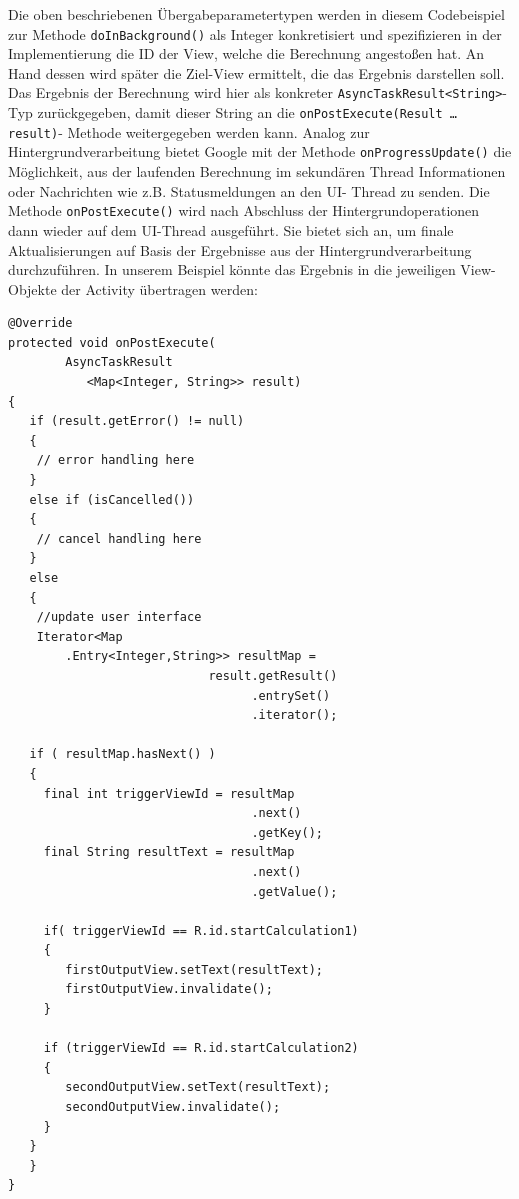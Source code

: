 \documentclass[12pt,oneside,a4paper,bibtotoc,liststotoc]{scrreprt}
\begin{document}
Die oben beschriebenen Übergabeparametertypen werden in diesem Codebeispiel zur Methode \texttt{doInBackground()} als Integer konkretisiert und spezifizieren in der Implementierung die ID der View, welche die Berechnung angestoßen hat. An Hand dessen wird später die Ziel-View ermittelt, die das Ergebnis darstellen soll. Das Ergebnis der Berechnung wird hier als konkreter \texttt{AsyncTaskResult<String>}- Typ zurückgegeben, damit dieser String an die \texttt{onPostExecute(Result … result)}- Methode weitergegeben werden kann. Analog zur Hintergrundverarbeitung bietet Google mit der Methode \texttt{onProgressUpdate()} die Möglichkeit, aus der laufenden Berechnung im sekundären Thread Informationen oder Nachrichten wie z.B. Statusmeldungen an den UI- Thread zu senden. Die Methode \texttt{onPostExecute()} wird nach Abschluss der Hintergrundoperationen dann wieder auf dem UI-Thread ausgeführt. Sie bietet sich an, um finale Aktualisierungen auf Basis der Ergebnisse aus der Hintergrundverarbeitung durchzuführen. In unserem Beispiel könnte das Ergebnis in die jeweiligen View- Objekte der Activity übertragen werden:\newline
\begin{lstlisting}
@Override
protected void onPostExecute(
        AsyncTaskResult
           <Map<Integer, String>> result)
{
   if (result.getError() != null)
   {
    // error handling here
   }
   else if (isCancelled())
   {
    // cancel handling here
   }
   else
   {
    //update user interface
    Iterator<Map
        .Entry<Integer,String>> resultMap = 
                            result.getResult()
                                  .entrySet()
                                  .iterator();

   if ( resultMap.hasNext() )
   {
     final int triggerViewId = resultMap
                                  .next()
                                  .getKey();
     final String resultText = resultMap
                                  .next()
                                  .getValue();

     if( triggerViewId == R.id.startCalculation1)
     {
        firstOutputView.setText(resultText);
        firstOutputView.invalidate();
     }

     if (triggerViewId == R.id.startCalculation2)
     {
        secondOutputView.setText(resultText);
        secondOutputView.invalidate();
     }
   }
   } 
}
\end{lstlisting}
\end{document}
